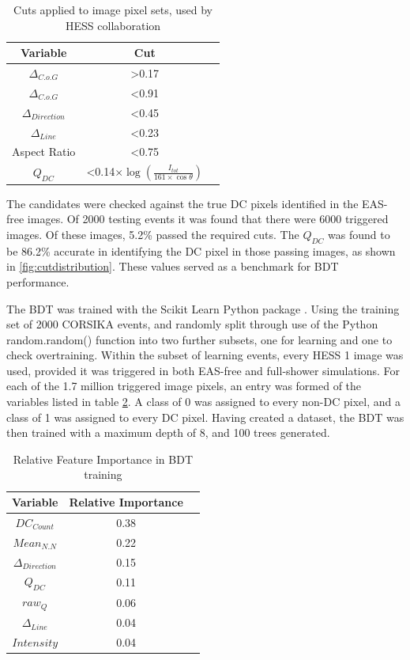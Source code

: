 \documentclass[]{article}
\begin{document}
\begin{table}[h!]
  \centering
  \caption{Cuts applied to image pixel sets, used by HESS collaboration \cite{hess07}}
  \label{tab:table1}
  \begin{tabular}{ccc}
    \toprule
    Variable & Cut\\
    \midrule
     $ \Delta_{C.o.G}$ & \textgreater 0.17 \\
     $ \Delta_{C.o.G}$ & \textless 0.91 \\
     $\Delta_{Direction}$ & \textless 0.45 \\
     $\Delta_{Line}$ & \textless 0.23 \\
     Aspect Ratio & \textless 0.75 \\
     $Q_{DC}$ & \textless 0.14$ \times \log(\frac{I_{tot}}{161 \times \cos \theta})$ \\
    \bottomrule
  \end{tabular}
\end{table}

The candidates were checked against the true DC pixels identified in the EAS-free images. Of 2000 testing events it was found that there were 6000 triggered images. Of these images, 5.2\% passed the required cuts. The $Q_{DC}$ was found to be 86.2\% accurate in identifying the DC pixel in those passing images, as shown in \ref{fig:cutdistribution}. These values served as a benchmark for BDT performance. 

The BDT was trained with the Scikit Learn Python package \cite{scikit-learn}. Using the training set of 2000 CORSIKA events, and randomly split through use of the Python random.random() function into two further subsets, one for learning and one to check overtraining. Within the subset of learning events, every HESS 1 image was used, provided it was triggered in both EAS-free and full-shower simulations. For each of the 1.7 million triggered image pixels, an entry was formed of the variables listed in table \ref{tab:table2}. A class of 0 was assigned to every non-DC pixel, and a class of 1 was assigned to every DC pixel. Having created a dataset, the BDT was then trained with a maximum depth of 8, and 100 trees generated.

\begin{table}[h!]
  \centering
  \caption{Relative Feature Importance in BDT training}
  \label{tab:table2}
  \begin{tabular}{ccc}
    \toprule
    Variable & Relative Importance\\
    \midrule
    $DC_{Count}$ & 0.38\\
    $Mean_{N.N}$ & 0.22\\
    $\Delta_{Direction}$ & 0.15\\
    $Q_{DC}$ & 0.11\\
    $raw_{Q}$ & 0.06\\
    $\Delta_{Line}$ & 0.04\\
    $Intensity$ & 0.04\\
    \bottomrule
  \end{tabular}
\end{table}
\end{document}
